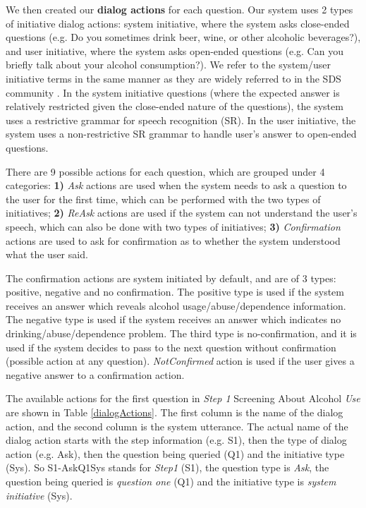 \begin{sloppy}
We then created our {\bf dialog actions} for each question. Our system uses 2 types of initiative dialog actions: system initiative, where the system asks close-ended questions (e.g. Do you sometimes drink beer, wine, or other alcoholic beverages?), and user initiative, where the system asks open-ended questions (e.g. Can you briefly talk about your alcohol consumption?). We refer to the system/user initiative terms in the same manner as they are widely referred to in the SDS community \cite{NjFunSingh02,singh2000empirical}.  In the system initiative questions (where the expected answer is relatively restricted given the close-ended nature of the questions), the system uses a restrictive grammar for speech recognition (SR).  In the user initiative, the system uses a non-restrictive SR grammar to handle user's answer to open-ended questions. 

There are 9 possible actions for each question, which are grouped under 4 categories: \textbf{1)} \textit{Ask} actions are used when the system needs to ask a question to the user for the first time, which can be performed with the two types of initiatives; \textbf{2)} \textit{ReAsk} actions are used if the system can not understand the user's speech, which can also be done with two types of initiatives; \textbf{3)} \textit{Confirmation} actions are used to ask for confirmation as to whether the system understood what the user said. 

The confirmation actions are system initiated by default, and are of 3 types: positive, negative and no confirmation. The positive type is used if the system receives an answer which reveals alcohol usage/abuse/dependence information. The negative type is used if the system receives an answer which indicates no drinking/abuse/dependence problem. The third type is no-confirmation, and it is used if the system decides to pass to the next question without confirmation (possible action at any question). \textit{NotConfirmed} action is used if the user gives a negative answer to a confirmation action. 

The available actions for the first question in \textit{Step 1} Screening About Alcohol {\em Use} are shown in Table \ref{dialogActions}. The first column is the name of the dialog action, and the second column is the system utterance. The actual name of the dialog action starts with the step information (e.g. S1), then the type of dialog action (e.g. Ask), then the question being queried (Q1) and the initiative type (Sys). So S1-AskQ1Sys stands for \textit{Step1} (S1), the question type is \textit{Ask}, the question being queried is \textit{question one} (Q1) and the initiative type is \textit{system initiative} (Sys).


\end{sloppy}

